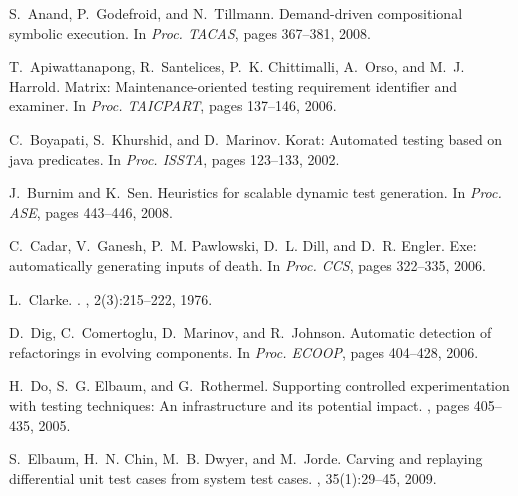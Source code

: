 \documentclass{llncs}
\begin{document}
\thispagestyle{empty}
\begin{sloppy}





%






\end{sloppy}
%

% 
\vspace{-0.2 cm}
\begin{thebibliography}{10}
\begin{scriptsize}


S.~Anand, P.~Godefroid, and N.~Tillmann.
\newblock Demand-driven compositional symbolic execution.
\newblock In {\em Proc. TACAS}, pages 367--381, 2008.

T.~Apiwattanapong, R.~Santelices, P.~K. Chittimalli, A.~Orso, and M.~J.
  Harrold.
\newblock Matrix: Maintenance-oriented testing requirement identifier and
  examiner.
\newblock In {\em Proc. TAICPART}, pages 137--146, 2006.

C.~Boyapati, S.~Khurshid, and D.~Marinov.
\newblock Korat: Automated testing based on java predicates.
\newblock In {\em Proc. ISSTA}, pages 123--133, 2002.

J.~Burnim and K.~Sen.
\newblock Heuristics for scalable dynamic test generation.
\newblock In {\em Proc. ASE}, pages 443--446, 2008.

C.~Cadar, V.~Ganesh, P.~M. Pawlowski, D.~L. Dill, and D.~R. Engler.
\newblock Exe: automatically generating inputs of death.
\newblock In {\em Proc. CCS}, pages 322--335, 2006.

L.~Clarke.
.
, 2(3):215--222, 1976.

D.~Dig, C.~Comertoglu, D.~Marinov, and R.~Johnson.
\newblock Automatic detection of refactorings in evolving components.
\newblock In {\em Proc. ECOOP}, pages 404--428, 2006.

H.~Do, S.~G. Elbaum, and G.~Rothermel.
\newblock Supporting controlled experimentation with testing techniques: An
  infrastructure and its potential impact.
, pages 405--435, 2005.

S.~Elbaum, H.~N. Chin, M.~B. Dwyer, and M.~Jorde.
\newblock Carving and replaying differential unit test cases from system test
  cases.
, 35(1):29--45, 2009.


\end{scriptsize}
\end{thebibliography}
\end{document}
